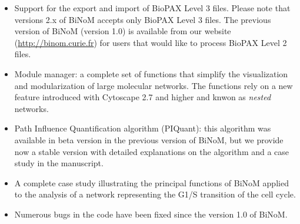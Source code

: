 \documentclass[a4paper,10pt]{article}
\begin{document}
\begin{itemize}
 \item Support for the export and import of BioPAX Level 3 files. Please note
that versions 2.x of BiNoM accepts only BioPAX Level 3 files. The previous
version of BiNoM (version 1.0) is available from our website
(\url{http://binom.curie.fr}) for users that would like to process BioPAX Level
2 files.

 \item Module manager: a complete set of functions that simplify the
visualization and modularization of large molecular networks. The functions rely
on a new feature introduced with Cytoscape 2.7 and higher and knwon as
\textit{nested} networks.

 \item Path Influence Quantification algorithm (PIQuant): this algorithm was
available in beta version in the previous version of BiNoM, but we provide now a
stable version with detailed explanations on the algorithm and a case study in
the manuscript.

  \item A complete case study illustrating the principal functions of BiNoM applied to the analysis of a network representing the G1/S transition of the cell cycle.

  \item Numerous bugs in the code have been fixed since the version 1.0 of BiNoM.

\end{itemize}
\end{document}
